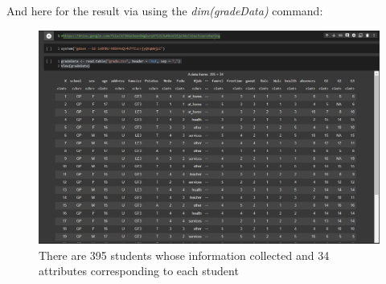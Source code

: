 \documentclass[a4paper]{article}
\begin{document}
And here for the result via using the \textit{dim(gradeData)} command:
\begin{figure}[H]
    \centering
    \includegraphics[scale = 0.7]{Images/1.PNG}
    \caption{There are 395 students whose information collected and 34 attributes corresponding to each student}
    \label{fig:dataset}
\end{figure}

\end{document}
